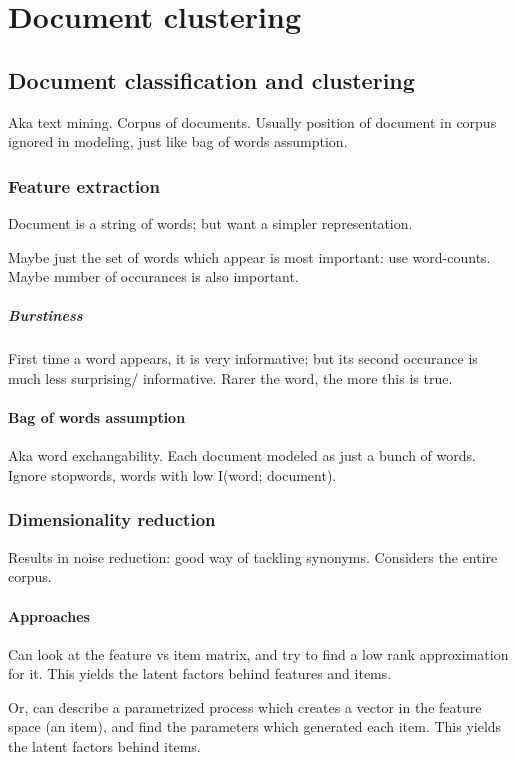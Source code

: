 \documentclass[oneside, article]{memoir}
\begin{document}
\chapter{Document clustering}
\section{Document classification and clustering}
Aka text mining. Corpus of documents. Usually position of document in corpus ignored in modeling, just like bag of words assumption.

\subsection{Feature extraction}
Document is a string of words; but want a simpler representation.

Maybe just the set of words which appear is most important: use word-counts. Maybe number of occurances is also important.

\paragraph*{Burstiness}
First time a word appears, it is very informative; but its second occurance is much less surprising/ informative. Rarer the word, the more this is true.

\subsubsection{Bag of words assumption}
Aka word exchangability. Each document modeled as just a bunch of words. Ignore stopwords, words with low I(word; document).

\subsection{Dimensionality reduction}
Results in noise reduction: good way of tackling synonyms. Considers the entire corpus.

\subsubsection{Approaches}
Can look at the feature vs item matrix, and try to find a low rank approximation for it. This yields the latent factors behind features and items.

Or, can describe a parametrized process which creates a vector in the feature space (an item), and find the parameters which generated each item. This yields the latent factors behind items.
\end{document}
